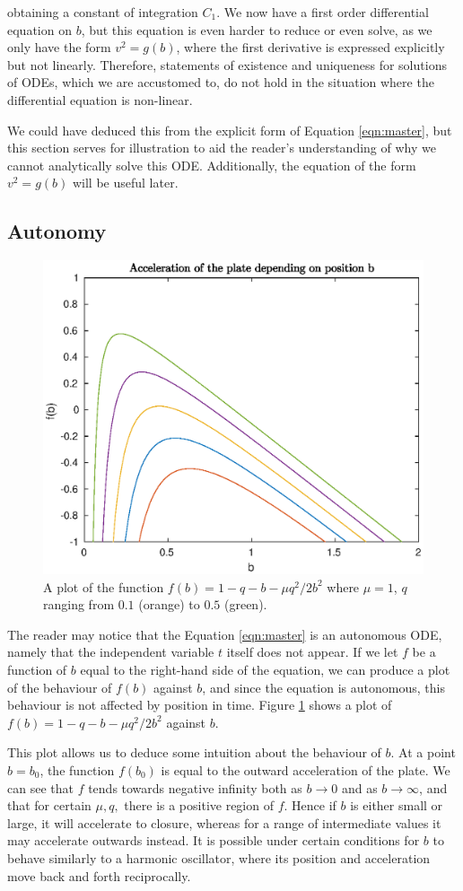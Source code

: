 \documentclass{article}
\begin{document}
obtaining a constant of integration $C_1$.
We now have a first order differential equation on $b$, %
but this equation is even harder to reduce or even solve, as we only have the form $v^2 = g(b)$,
where the first derivative is expressed explicitly but not linearly.
Therefore, statements of existence and uniqueness for solutions of ODEs,
which we are accustomed to,
do not hold in the situation where the differential equation is non-linear.

We could have deduced this from the explicit form of Equation \ref{eqn:master},
but this section serves for illustration to aid the reader's understanding of why we cannot analytically solve this ODE.
Additionally, the equation of the form $v^2 = g(b)$ will be useful later.

\subsection{Autonomy}

\begin{figure}
    \centering
    \includegraphics[width=0.5\linewidth]{f_plot_mu_1_q_vary}
    \caption{A plot of the function $f(b) = 1-q-b-\mu q^2/2b^2$ where $\mu=1$, $q$ ranging from $0.1$ (orange) to $0.5$ (green).}
    \label{fig:acc_b_plot}
\end{figure}

The reader may notice that the Equation \ref{eqn:master} is an autonomous ODE,
namely that the independent variable $t$ itself does not appear.
If we let $f$ be a function of $b$ equal to the right-hand side of the equation,
we can produce a plot of the behaviour of $f(b)$ against $b$,
and since the equation is autonomous, this behaviour is not affected by position in time.
Figure \ref{fig:acc_b_plot} shows a plot of $f(b)= 1 - q - b - \mu q^2/2b^2$ against $b$.

This plot allows us to deduce some intuition about the behaviour of $b$.
At a point $b=b_0$, the function $f(b_0)$ is equal to the outward acceleration of the plate.
We can see that $f$ tends towards negative infinity both as $b\rightarrow 0$ and as $b\rightarrow\infty$,
and that for certain $\mu, q,$ there is a positive region of $f$.
Hence if $b$ is either small or large, it will accelerate to closure,
whereas for a range of intermediate values it may accelerate outwards instead.
It is possible under certain conditions for $b$ to behave similarly to a harmonic oscillator,
where its position and acceleration move back and forth reciprocally.
\end{document}
